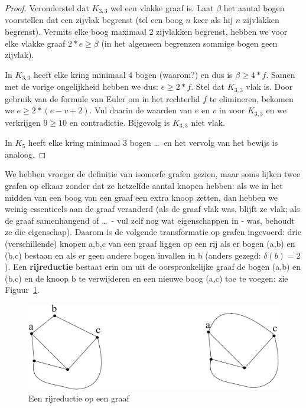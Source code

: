 \begin{proof}
Veronderstel dat $K_{3,3}$ wel een vlakke graaf is.
Laat $\beta$ het aantal bogen voorstellen dat een zijvlak begrenst (tel een
boog $n$ keer als hij $n$ zijvlakken begrenst). Vermits elke boog
maximaal 2 zijvlakken begrenst, hebben we voor elke vlakke graaf $2*e \geq
\beta$ (in het algemeen begrenzen sommige bogen geen zijvlak).

In $K_{3,3}$ heeft elke kring minimaal 4 bogen (waarom?) en dus is
$\beta \geq 4*f$. Samen met de vorige ongelijkheid hebben we dus: $e
\geq 2*f$. Stel dat $K_{3,3}$ vlak is. Door gebruik van de formule van
Euler om in het rechterlid $f$ te elimineren, bekomen we $e \geq 2*(e-v+2)$.
Vul daarin de waarden van $e$ en $v$ in voor $K_{3,3}$ en we
verkrijgen $9 \geq 10$ en contradictie. Bijgevolg is $K_{3,3}$ niet
vlak.

In $K_{5}$ heeft elke kring minimaal 3 bogen \ldots\ en het vervolg van
het bewijs is analoog.
\end{proof}




We hebben vroeger de definitie van isomorfe grafen gezien, maar soms
lijken twee grafen op elkaar zonder dat ze hetzelfde aantal knopen
hebben: als we in het midden van een boog van een graaf een extra
knoop zetten, dan hebben we weinig essentieels aan de graaf veranderd
(als de graaf vlak was, blijft ze vlak; als de graaf samenhangend of
\ldots\ - vul zelf nog wat eigenschappen in - was, behoudt ze die
eigenschap). Daarom is de volgende transformatie op grafen ingevoerd:
drie (verschillende) knopen a,b,c van een graaf liggen op een rij als
er bogen (a,b) en (b,c) bestaan en als er geen andere bogen invallen
in b (anders gezegd: $\delta(b) = 2$). Een \textbf{rijreductie}
bestaat erin om uit de oorspronkelijke graaf de bogen (a,b) en (b,c) en de
knoop b te verwijderen en een nieuwe boog (a,c) toe te voegen: zie
Figuur~\ref{rij1}.

\begin{figure}[ht]
\begin{center}
\includegraphics[width=0.4\linewidth,keepaspectratio]{rij1}
\end{center}
\caption{Een rijreductie op een graaf \label{rij1}}
\end{figure}

